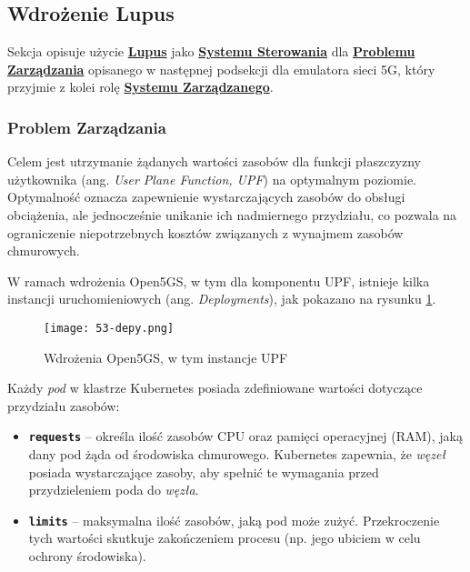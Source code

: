 \subsection{Wdrożenie Lupus}

Sekcja opisuje użycie \hyperlink{def:lupus}{\textbf{Lupus}} jako \hyperlink{def:system-sterowania}{\textbf{Systemu Sterowania}} dla \hyperlink{def:problem-zarzadzania}{\textbf{Problemu Zarządzania}} opisanego w następnej podsekcji dla emulatora sieci 5G, który przyjmie z kolei rolę \hyperlink{def:system-zarzadzany}{\textbf{Systemu Zarządzanego}}. 

\subsubsection{Problem Zarządzania}

Celem jest utrzymanie żądanych wartości zasobów dla funkcji płaszczyzny użytkownika (ang. \textit{User Plane Function, UPF}) na optymalnym poziomie. Optymalność oznacza zapewnienie wystarczających zasobów do obsługi obciążenia, ale jednocześnie unikanie ich nadmiernego przydziału, co pozwala na ograniczenie niepotrzebnych kosztów związanych z wynajmem zasobów chmurowych.

W ramach wdrożenia Open5GS, w tym dla komponentu UPF, istnieje kilka instancji uruchomieniowych (ang. \textit{Deployments}), jak pokazano na rysunku \ref{fig:53-depy}.

\begin{figure}[!h]
    \centering \texttt{[image: 53-depy.png]}
    \caption{Wdrożenia Open5GS, w tym instancje UPF}\label{fig:53-depy}
\end{figure}

Każdy \textit{pod} w klastrze Kubernetes posiada zdefiniowane wartości dotyczące przydziału zasobów:

\begin{itemize}
    \item \textbf{\texttt{requests}} – określa ilość zasobów CPU oraz pamięci operacyjnej (RAM), jaką dany pod żąda od środowiska chmurowego. Kubernetes zapewnia, że \textit{węzeł} posiada wystarczające zasoby, aby spełnić te wymagania przed przydzieleniem poda do \textit{węzła}.
    \item \textbf{\texttt{limits}} – maksymalna ilość zasobów, jaką pod może zużyć. Przekroczenie tych wartości skutkuje zakończeniem procesu (np. jego ubiciem w celu ochrony środowiska).
\end{itemize}

